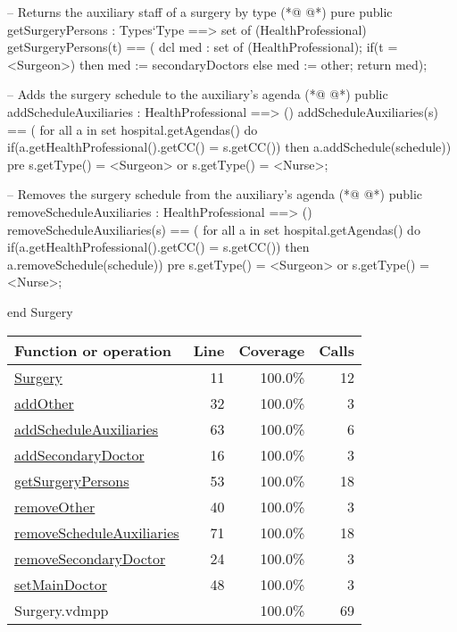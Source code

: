 \begin{vdmpp}[breaklines=true]
 -- Returns the auxiliary staff of a surgery by type
(*@
\label{getSurgeryPersons:53}
@*)
 pure public getSurgeryPersons : Types`Type ==> set of (HealthProfessional)
  getSurgeryPersons(t) == (
               dcl med : set of (HealthProfessional);
               if(t = <Surgeon>)
                then med := secondaryDoctors
               else
                med := other;
               return med);
 
 -- Adds the surgery schedule to the auxiliary's agenda            
(*@
\label{addScheduleAuxiliaries:63}
@*)
 public addScheduleAuxiliaries : HealthProfessional ==> ()
  addScheduleAuxiliaries(s) == (
   for all a in set hospital.getAgendas() do
    if(a.getHealthProfessional().getCC() = s.getCC())
     then a.addSchedule(schedule))
 pre s.getType() = <Surgeon> or s.getType() = <Nurse>;
 
 -- Removes the surgery schedule from the auxiliary's agenda
(*@
\label{removeScheduleAuxiliaries:71}
@*)
 public removeScheduleAuxiliaries : HealthProfessional ==> ()
  removeScheduleAuxiliaries(s) == (
   for all a in set hospital.getAgendas() do
    if(a.getHealthProfessional().getCC() = s.getCC())
     then a.removeSchedule(schedule))
 pre s.getType() = <Surgeon> or s.getType() = <Nurse>;
 
end Surgery
\end{vdmpp}
\bigskip
\begin{longtable}{|l|r|r|r|}
\hline
Function or operation & Line & Coverage & Calls \\
\hline
\hline
\hyperref[Surgery:11]{Surgery} & 11&100.0\% & 12 \\
\hline
\hyperref[addOther:32]{addOther} & 32&100.0\% & 3 \\
\hline
\hyperref[addScheduleAuxiliaries:63]{addScheduleAuxiliaries} & 63&100.0\% & 6 \\
\hline
\hyperref[addSecondaryDoctor:16]{addSecondaryDoctor} & 16&100.0\% & 3 \\
\hline
\hyperref[getSurgeryPersons:53]{getSurgeryPersons} & 53&100.0\% & 18 \\
\hline
\hyperref[removeOther:40]{removeOther} & 40&100.0\% & 3 \\
\hline
\hyperref[removeScheduleAuxiliaries:71]{removeScheduleAuxiliaries} & 71&100.0\% & 18 \\
\hline
\hyperref[removeSecondaryDoctor:24]{removeSecondaryDoctor} & 24&100.0\% & 3 \\
\hline
\hyperref[setMainDoctor:48]{setMainDoctor} & 48&100.0\% & 3 \\
\hline
\hline
Surgery.vdmpp & & 100.0\% & 69 \\
\hline
\end{longtable}

